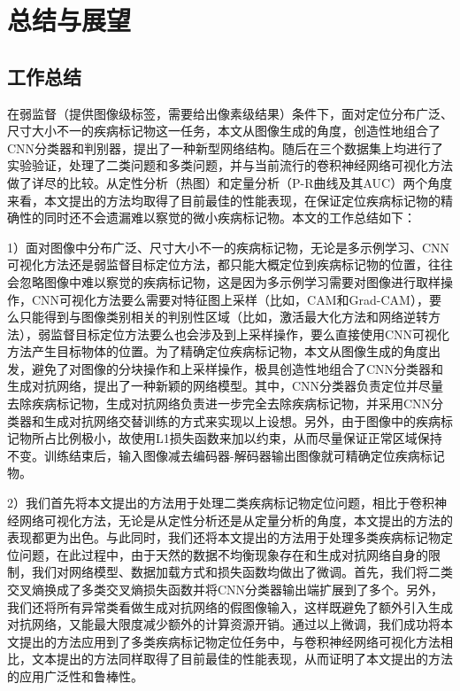 \chapter{总结与展望}
\section{工作总结}
在弱监督（提供图像级标签，需要给出像素级结果）条件下，面对定位分布广泛、尺寸大小不一的疾病标记物这一任务，本文从图像生成的角度，创造性地组合了CNN分类器和判别器，提出了一种新型网络结构。随后在三个数据集上均进行了实验验证，处理了二类问题和多类问题，并与当前流行的卷积神经网络可视化方法做了详尽的比较。从定性分析（热图）和定量分析（P-R曲线及其AUC）两个角度来看，本文提出的方法均取得了目前最佳的性能表现，在保证定位疾病标记物的精确性的同时还不会遗漏难以察觉的微小疾病标记物。本文的工作总结如下：

1）面对图像中分布广泛、尺寸大小不一的疾病标记物，无论是多示例学习、CNN可视化方法还是弱监督目标定位方法，都只能大概定位到疾病标记物的位置，往往会忽略图像中难以察觉的疾病标记物，这是因为多示例学习需要对图像进行取样操作，CNN可视化方法要么需要对特征图上采样（比如，CAM和Grad-CAM），要么只能得到与图像类别相关的判别性区域（比如，激活最大化方法和网络逆转方法），弱监督目标定位方法要么也会涉及到上采样操作，要么直接使用CNN可视化方法产生目标物体的位置。为了精确定位疾病标记物，本文从图像生成的角度出发，避免了对图像的分块操作和上采样操作，极具创造性地组合了CNN分类器和生成对抗网络，提出了一种新颖的网络模型。其中，CNN分类器负责定位并尽量去除疾病标记物，生成对抗网络负责进一步完全去除疾病标记物，并采用CNN分类器和生成对抗网络交替训练的方式来实现以上设想。另外，由于图像中的疾病标记物所占比例极小，故使用L1损失函数来加以约束，从而尽量保证正常区域保持不变。训练结束后，输入图像减去编码器-解码器输出图像就可精确定位疾病标记物。

2）我们首先将本文提出的方法用于处理二类疾病标记物定位问题，相比于卷积神经网络可视化方法，无论是从定性分析还是从定量分析的角度，本文提出的方法的表现都更为出色。与此同时，我们还将本文提出的方法用于处理多类疾病标记物定位问题，在此过程中，由于天然的数据不均衡现象存在和生成对抗网络自身的限制，我们对网络模型、数据加载方式和损失函数均做出了微调。首先，我们将二类交叉熵换成了多类交叉熵损失函数并将CNN分类器输出端扩展到了多个。另外，我们还将所有异常类看做生成对抗网络的假图像输入，这样既避免了额外引入生成对抗网络，又能最大限度减少额外的计算资源开销。通过以上微调，我们成功将本文提出的方法应用到了多类疾病标记物定位任务中，与卷积神经网络可视化方法相比，文本提出的方法同样取得了目前最佳的性能表现，从而证明了本文提出的方法的应用广泛性和鲁棒性。

